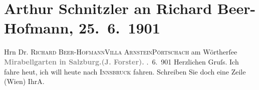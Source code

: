 

         
         \renewcommand{\erwaehntePersonen}{Personen: Richard Beer-Hofmann, Jacob Forster}
         \renewcommand{\erwaehnteOrte}{Orte: Hauptbahnhof Salzburg, Innsbruck, Mirabell, Pörtschach, Salzburg, Villa Arnstein, Wien}
         \renewcommand{\erwaehnteWerke}{}
               \section[Arthur Schnitzler an Richard Beer-Hofmann, 25. 6. 1901]{ Arthur Schnitzler an Richard Beer-Hofmann, 25. 6. 1901}\nopagebreak{}\rehead{ }\begin{ledgroupsized}[t]{13cm}\normalsize\beginnumbering \toendnotes[C]{\smallbreak\pagebreak[2]} 
\pstart{}{\pb}Hrn Dr. \textsc{Richard
                     Beer-Hofmann}\pend{}\pstart{}\textsc{Villa Arnstein}\pend{}\pstart{}\textsc{Pörtschach} am Wörtherſee\pend{}{\bigskip}\pstart
           \noindent{}\centering{}{\pb}\textcolor{gray}{\textbf{Mirabellgarten in Salzburg.\hspace*{1.5em}(J.
                        Forster).}}\pend
           . 6. 901\pend
           \pstart
           Herzlichen Gruſs. Ich fahre heut, ich will heute nach \textsc{Innsbruck} fahren. Schreiben Sie doch eine Zeile (Wien)\pend
           \pstart Ihr\spacefill\mbox{A.}\pend{}
         
         \endnumbering{}\end{ledgroupsized}  \newcommand{\dateiname}{L01133}\newcommand{\titel}{Arthur Schnitzler an Richard Beer-Hofmann, 25. 6. 1901}\newcommand{\editorInnen}{Martin Anton Müller und Gerd-Hermann Susen}
      
